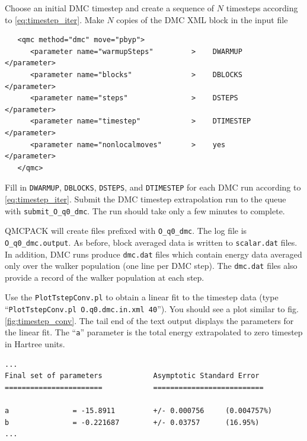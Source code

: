 Choose an initial DMC timestep and create a sequence of $N$ timesteps according to \ref{eq:timestep_iter}.  Make $N$ copies of the DMC XML block in the input file
\begin{shaded}
\begin{verbatim}
   <qmc method="dmc" move="pbyp">
      <parameter name="warmupSteps"         >    DWARMUP         </parameter>
      <parameter name="blocks"              >    DBLOCKS         </parameter>
      <parameter name="steps"               >    DSTEPS          </parameter>
      <parameter name="timestep"            >    DTIMESTEP       </parameter>
      <parameter name="nonlocalmoves"       >    yes             </parameter>
   </qmc>
\end{verbatim}
\end{shaded}
\noindent
Fill in \texttt{DWARMUP}, \texttt{DBLOCKS}, \texttt{DSTEPS}, and \texttt{DTIMESTEP} for each DMC run according to \ref{eq:timestep_iter}.  Submit the DMC timestep extrapolation run to the queue with \texttt{submit\_O\_q0\_dmc}.  The run should take only a few minutes to complete.

QMCPACK will create files prefixed with \texttt{O\_q0\_dmc}.  The log file is \texttt{O\_q0\_dmc.output}.  As before, block averaged data is written to \texttt{scalar.dat} files.  In addition, DMC runs produce \texttt{dmc.dat} files which contain energy data averaged only over the walker population (one line per DMC step).  The \texttt{dmc.dat} files also provide a record of the walker population at each step.

Use the \texttt{PlotTstepConv.pl} to obtain a linear fit to the timestep data (type ``\texttt{PlotTstepConv.pl O.q0.dmc.in.xml 40}'').  You should see a plot similar to fig. \ref{fig:timestep_conv}.  The tail end of the text output displays the parameters for the linear fit.  The ``\texttt{a}'' parameter is the total energy extrapolated to zero timestep in Hartree units. 

\begin{shaded}
\begin{verbatim}
...
Final set of parameters            Asymptotic Standard Error
=======================            ==========================

a               = -15.8911         +/- 0.000756     (0.004757%)
b               = -0.221687        +/- 0.03757      (16.95%)
...
\end{verbatim}
\end{shaded}

